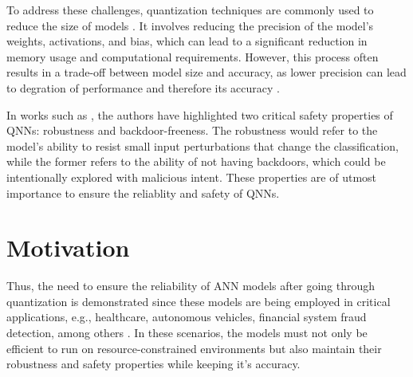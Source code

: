 \begin{comment}
    (JACOB et al., 2017;  LIN; TALATHI; ANNAPUREDDY, 2016)
    (HAN; MAO; DALLY, 2016; NAGEL et al.,  2021)
    (JACOB et al., 2017; HUBARA et  al., 2017)
\end{comment}


To address these challenges, quantization techniques are commonly used to reduce the size of models \cite{Zhu2016Trained, Zhu2020Survey}. It involves reducing the precision of the model's weights, activations, and bias, which can lead to a significant reduction in memory usage and computational requirements. However, this process often results in a trade-off between model size and accuracy, as lower precision can lead to degration of performance and therefore its accuracy \cite{Zhou2017Incremental}.

In works such as \cite{cai2025certified}, the authors have highlighted two critical safety properties of QNNs: robustness and backdoor-freeness. The robustness would refer to the model's ability to resist small input perturbations that change the classification, while the former refers to the ability of not having backdoors, which could be intentionally explored with malicious intent. These properties are of utmost importance to ensure the reliablity and safety of QNNs.


\section{Motivation}\label{sec:motivation}



Thus, the need to ensure the reliability of ANN models after going through quantization is demonstrated since these models are being employed in critical applications, e.g., healthcare, autonomous vehicles, financial system fraud detection, among others \cite{OpenAI2023GPT4, Luo2025Efficient, Lei2025An, Zhu2024A}. In these scenarios, the models must not only be efficient to run on resource-constrained environments but also maintain their robustness and safety properties while keeping it's accuracy. 

